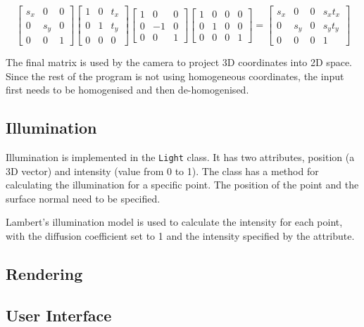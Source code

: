 \documentclass[]{article}
\begin{document}
\[
  \begin{bmatrix}
    s_x & 0 & 0 \\
    0 & s_y & 0 \\
    0 & 0 & 1
  \end{bmatrix}
  \begin{bmatrix}
    1 & 0 & t_x \\
    0 & 1 & t_y \\
    0 & 0 & 0
  \end{bmatrix}
  \begin{bmatrix}
    1 & 0 & 0 \\
    0 & -1 & 0 \\
    0 & 0 & 1
  \end{bmatrix}
  \begin{bmatrix}
    1 & 0 & 0 & 0 \\
    0 & 1 & 0 & 0 \\
    0 & 0 & 0 & 1
  \end{bmatrix}
  =
  \begin{bmatrix}
    s_x & 0 & 0 & s_x t_x \\
    0 & s_y & 0 & s_y t_y \\
    0 & 0 & 0 & 1
  \end{bmatrix}
\]

The final matrix is used by the camera to project 3D coordinates into 2D space. Since the rest of the program is not using homogeneous coordinates, the input first needs to be homogenised and then de-homogenised.

\subsection{Illumination}

Illumination is implemented in the \texttt{Light} class. It has two attributes, position (a 3D vector) and intensity (value from 0 to 1). The class has a method for calculating the illumination for a specific point. The position of the point and the surface normal need to be specified.

Lambert's illumination model is used to calculate the intensity for each point, with the diffusion coefficient set to 1 and the intensity specified by the attribute.

\subsection{Rendering}

\subsection{User Interface}
\end{document}
